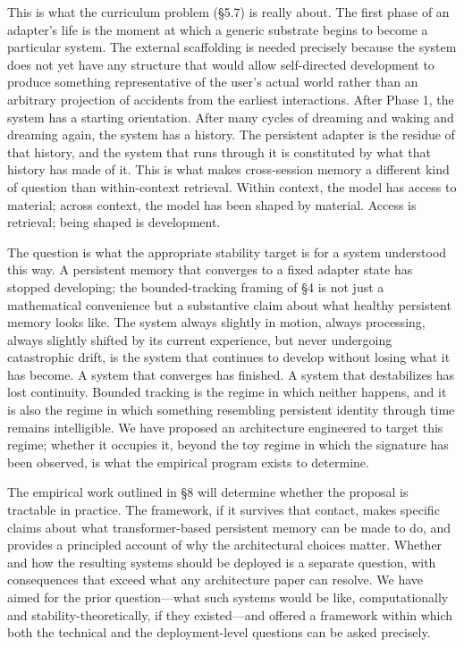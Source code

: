 \documentclass[11pt]{article}
\begin{document}
This is what the curriculum problem (\S 5.7) is really about. The first phase of an adapter's life is the moment at which a generic substrate begins to become a particular system. The external scaffolding is needed precisely because the system does not yet have any structure that would allow self-directed development to produce something representative of the user's actual world rather than an arbitrary projection of accidents from the earliest interactions. After Phase 1, the system has a starting orientation. After many cycles of dreaming and waking and dreaming again, the system has a history. The persistent adapter is the residue of that history, and the system that runs through it is constituted by what that history has made of it. This is what makes cross-session memory a different kind of question than within-context retrieval. Within context, the model has access to material; across context, the model has been shaped by material. Access is retrieval; being shaped is development.

The question is what the appropriate stability target is for a system understood this way. A persistent memory that converges to a fixed adapter state has stopped developing; the bounded-tracking framing of \S 4 is not just a mathematical convenience but a substantive claim about what healthy persistent memory looks like. The system always slightly in motion, always processing, always slightly shifted by its current experience, but never undergoing catastrophic drift, is the system that continues to develop without losing what it has become. A system that converges has finished. A system that destabilizes has lost continuity. Bounded tracking is the regime in which neither happens, and it is also the regime in which something resembling persistent identity through time remains intelligible. We have proposed an architecture engineered to target this regime; whether it occupies it, beyond the toy regime in which the signature has been observed, is what the empirical program exists to determine.

The empirical work outlined in \S 8 will determine whether the proposal is tractable in practice. The framework, if it survives that contact, makes specific claims about what transformer-based persistent memory can be made to do, and provides a principled account of why the architectural choices matter. Whether and how the resulting systems should be deployed is a separate question, with consequences that exceed what any architecture paper can resolve. We have aimed for the prior question---what such systems would be like, computationally and stability-theoretically, if they existed---and offered a framework within which both the technical and the deployment-level questions can be asked precisely.
\end{document}
